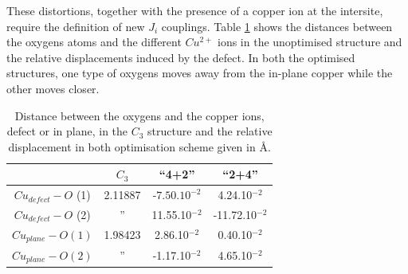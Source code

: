 \documentclass[12pt]{report}
\numberwithin{equation}{section}
\begin{document}
These distortions, together with the presence of a copper ion at the intersite, require the definition of new $J_i$ couplings.
Table \ref{tab:DefautDist} shows the distances between the oxygens atoms and the different $Cu^{2+}$ ions in the unoptimised structure and the relative displacements induced by the defect.
In both the optimised structures, one type of oxygens moves away from the in-plane copper while the other moves closer.

\begin{table}[!ht]
    \centering
    \begin{tabular}{c | c c c}
        & $C_3$ & ``4+2'' & ``2+4''\\
        \hline
        \hline
        $Cu_{defect}-O$ (1) & 2.11887 & -$7.50.10^{-2}$ & 4.24.10$^{-2}$ \\
        $Cu_{defect}-O$ (2) & '' & 11.55.10$^{-2}$ & -11.72.10$^{-2}$ \\
        \hline
        $Cu_{plane}-O (1)$ & 1.98423 & 2.86.10$^{-2}$ & 0.40.10$^{-2}$ \\
        $Cu_{plane}-O (2)$  & '' & -1.17.10$^{-2}$ & 4.65.10$^{-2}$\\
    \end{tabular}
    \caption{Distance between the oxygens and the copper ions, defect or in plane, in the $C_3$ structure and the relative displacement in both optimisation scheme given in \AA.}
    \label{tab:DefautDist}
\end{table}
\end{document}
